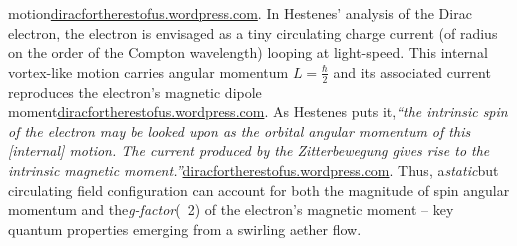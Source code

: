 motion\href{https://diracfortherestofus.wordpress.com/2018/06/05/12-zitterwebegung/#:~:text=direction%20of%20the%20electron%20spin,intrinsic%20magnetic%20moment%20of%20the}{diracfortherestofus.wordpress.com}. In Hestenes’ analysis of the Dirac electron, the electron is envisaged as a tiny circulating charge current (of radius on the order of the Compton wavelength) looping at light-speed. This internal vortex-like motion carries angular momentum $L=\tfrac{\hbar}{2}$ and its associated current reproduces the electron’s magnetic dipole moment\href{https://diracfortherestofus.wordpress.com/2018/06/05/12-zitterwebegung/#:~:text=direction%20of%20the%20electron%20spin,intrinsic%20magnetic%20moment%20of%20the}{diracfortherestofus.wordpress.com}. As Hestenes puts it,\textit{“the intrinsic spin of the electron may be looked upon as the orbital angular momentum of this [internal] motion. The current produced by the Zitterbewegung gives rise to the intrinsic magnetic moment.”}\href{https://diracfortherestofus.wordpress.com/2018/06/05/12-zitterwebegung/#:~:text=direction%20of%20the%20electron%20spin,intrinsic%20magnetic%20moment%20of%20the}{diracfortherestofus.wordpress.com}. Thus, a\textit{static}but circulating field configuration can account for both the magnitude of spin angular momentum and the\textit{g-factor}(~2) of the electron’s magnetic moment – key quantum properties emerging from a swirling aether flow.

